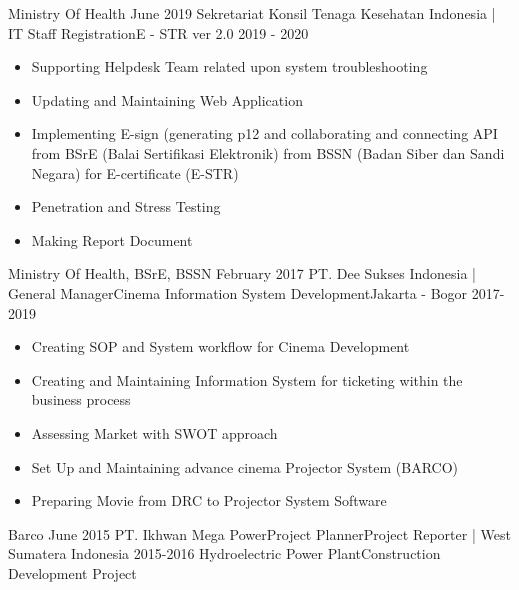 \begin{experiences}
{\begin{itemize}
                      \end{itemize}
                    }
                    {Ministry Of Health}
  \emptySeparator
  \experience
    {June 2019} {Sekretariat Konsil Tenaga Kesehatan Indonesia | IT Staff }{Registration}{E - STR ver 2.0}
    {2019 - 2020}    {
                      \begin{itemize}
                        \item Supporting Helpdesk Team related upon system troubleshooting                          
                        \item Updating and Maintaining Web Application                     
                        \item Implementing E-sign (generating p12 and collaborating and connecting API from BSrE (Balai Sertifikasi Elektronik) from BSSN (Badan Siber dan Sandi Negara) for E-certificate (E-STR) 
                        \item Penetration and Stress Testing 
                        \item Making Report Document                                                                   
                      \end{itemize}
                    }
                    {Ministry Of Health, BSrE, BSSN}
  \emptySeparator
  \experience
    {February 2017}     {PT. Dee Sukses Indonesia | General Manager}{Cinema Information System Development}{Jakarta - Bogor}
    {2017-2019}    {
                      \begin{itemize}
                        \item Creating SOP and System workflow for Cinema Development
                        \item Creating and Maintaining Information System for ticketing within the business process                
                        \item Assessing Market with SWOT approach               
                        \item Set Up and Maintaining advance cinema Projector System (BARCO)                        
                        \item Preparing Movie from DRC to Projector System Software                                                  
                      \end{itemize}
                    }
                    {Barco}
  \emptySeparator
  \consultantexperience
  {June 2015}       {PT. Ikhwan Mega Power}{Project Planner}{Project Reporter | West Sumatera Indonesia}
  {2015-2016}      {Hydroelectric Power Plant}{Construction Development Project}
                    {
        
}
\end{experiences}
